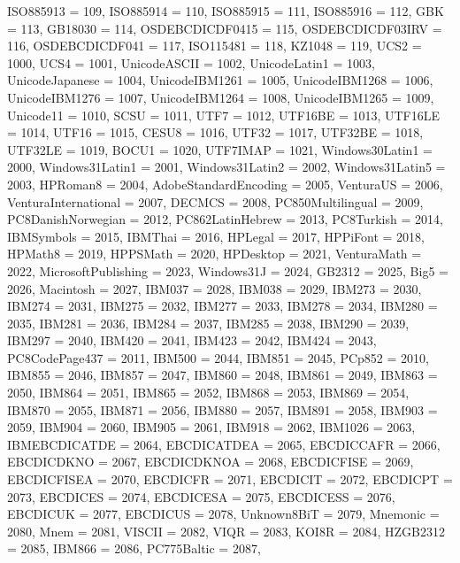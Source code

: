 \begin{codeblock}
{{    ISO885913 = 109,
    ISO885914 = 110,
    ISO885915 = 111,
    ISO885916 = 112,
    GBK = 113,
    GB18030 = 114,
    OSDEBCDICDF0415 = 115,
    OSDEBCDICDF03IRV = 116,
    OSDEBCDICDF041 = 117,
    ISO115481 = 118,
    KZ1048 = 119,
    UCS2 = 1000,
    UCS4 = 1001,
    UnicodeASCII = 1002,
    UnicodeLatin1 = 1003,
    UnicodeJapanese = 1004,
    UnicodeIBM1261 = 1005,
    UnicodeIBM1268 = 1006,
    UnicodeIBM1276 = 1007,
    UnicodeIBM1264 = 1008,
    UnicodeIBM1265 = 1009,
    Unicode11 = 1010,
    SCSU = 1011,
    UTF7 = 1012,
    UTF16BE = 1013,
    UTF16LE = 1014,
    UTF16 = 1015,
    CESU8 = 1016,
    UTF32 = 1017,
    UTF32BE = 1018,
    UTF32LE = 1019,
    BOCU1 = 1020,
    UTF7IMAP = 1021,
    Windows30Latin1 = 2000,
    Windows31Latin1 = 2001,
    Windows31Latin2 = 2002,
    Windows31Latin5 = 2003,
    HPRoman8 = 2004,
    AdobeStandardEncoding = 2005,
    VenturaUS = 2006,
    VenturaInternational = 2007,
    DECMCS = 2008,
    PC850Multilingual = 2009,
    PC8DanishNorwegian = 2012,
    PC862LatinHebrew = 2013,
    PC8Turkish = 2014,
    IBMSymbols = 2015,
    IBMThai = 2016,
    HPLegal = 2017,
    HPPiFont = 2018,
    HPMath8 = 2019,
    HPPSMath = 2020,
    HPDesktop = 2021,
    VenturaMath = 2022,
    MicrosoftPublishing = 2023,
    Windows31J = 2024,
    GB2312 = 2025,
    Big5 = 2026,
    Macintosh = 2027,
    IBM037 = 2028,
    IBM038 = 2029,
    IBM273 = 2030,
    IBM274 = 2031,
    IBM275 = 2032,
    IBM277 = 2033,
    IBM278 = 2034,
    IBM280 = 2035,
    IBM281 = 2036,
    IBM284 = 2037,
    IBM285 = 2038,
    IBM290 = 2039,
    IBM297 = 2040,
    IBM420 = 2041,
    IBM423 = 2042,
    IBM424 = 2043,
    PC8CodePage437 = 2011,
    IBM500 = 2044,
    IBM851 = 2045,
    PCp852 = 2010,
    IBM855 = 2046,
    IBM857 = 2047,
    IBM860 = 2048,
    IBM861 = 2049,
    IBM863 = 2050,
    IBM864 = 2051,
    IBM865 = 2052,
    IBM868 = 2053,
    IBM869 = 2054,
    IBM870 = 2055,
    IBM871 = 2056,
    IBM880 = 2057,
    IBM891 = 2058,
    IBM903 = 2059,
    IBM904 = 2060,
    IBM905 = 2061,
    IBM918 = 2062,
    IBM1026 = 2063,
    IBMEBCDICATDE = 2064,
    EBCDICATDEA = 2065,
    EBCDICCAFR = 2066,
    EBCDICDKNO = 2067,
    EBCDICDKNOA = 2068,
    EBCDICFISE = 2069,
    EBCDICFISEA = 2070,
    EBCDICFR = 2071,
    EBCDICIT = 2072,
    EBCDICPT = 2073,
    EBCDICES = 2074,
    EBCDICESA = 2075,
    EBCDICESS = 2076,
    EBCDICUK = 2077,
    EBCDICUS = 2078,
    Unknown8BiT = 2079,
    Mnemonic = 2080,
    Mnem = 2081,
    VISCII = 2082,
    VIQR = 2083,
    KOI8R = 2084,
    HZGB2312 = 2085,
    IBM866 = 2086,
    PC775Baltic = 2087,
}}
\end{codeblock}
